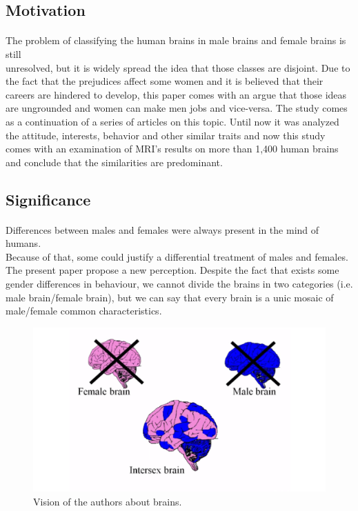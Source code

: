 \documentclass[paper=a4, fontsize=11pt]{scrartcl} %
\numberwithin{equation}{section} %
\numberwithin{figure}{section} %
\numberwithin{table}{section} %
\begin{document}
			\subsection{Motivation}							\paragraph{}
The problem of classifying the human brains in male brains and female brains is still\\ unresolved, but it is widely spread the idea that those classes are disjoint.
Due to the fact that the prejudices affect some women and it is believed that their careers are hindered to develop, this paper comes with an argue that those ideas are ungrounded  and women can make men jobs and vice-versa.
The study comes as a continuation of a series of articles on this topic. Until now it was analyzed the attitude, interests, behavior and other similar traits and now this study comes with an examination of MRI's results on more than 1,400 human brains and conclude that the similarities are predominant.
\subsection{Significance}\paragraph{}
Differences between males and females were always present in the mind of humans.\\ Because of that, some could justify a differential treatment of males and females.
The present paper propose a new perception. Despite the fact that exists some gender differences in behaviour, we cannot divide the brains in two categories (i.e. male brain/female brain), but we can say that every brain is a unic mosaic of male/female common characteristics.


\begin{figure}[h!]
			\centering
			\includegraphics[scale=0.25]	{brainMosaic2.png}
		 	\caption{Vision of the authors about brains.}
 		
  			\label{fig:ends}
  			
		\end{figure}
\end{document}
